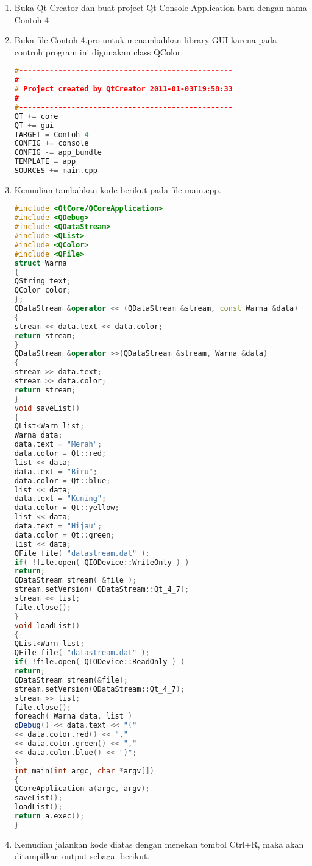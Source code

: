 \begin{enumerate}
\def\labelenumi{\arabic{enumi}.}
\item
  Buka Qt Creator dan buat project Qt Console Application baru dengan
  nama Contoh 4
\item
  Buka file Contoh 4.pro untuk menambahkan library GUI karena pada
  controh program ini digunakan class QColor.

\begin{lstlisting}[language=c++]
#-------------------------------------------------
#
# Project created by QtCreator 2011-01-03T19:58:33
#
#-------------------------------------------------
QT += core
QT += gui
TARGET = Contoh 4
CONFIG += console
CONFIG -= app_bundle
TEMPLATE = app
SOURCES += main.cpp
\end{lstlisting}
\item
  Kemudian tambahkan kode berikut pada file main.cpp.

\begin{lstlisting}[language=c++]
#include <QtCore/QCoreApplication>
#include <QDebug>
#include <QDataStream>
#include <QList>
#include <QColor>
#include <QFile>
struct Warna
{
QString text;
QColor color;
};
QDataStream &operator << (QDataStream &stream, const Warna &data)
{
stream << data.text << data.color;
return stream;
}
QDataStream &operator >>(QDataStream &stream, Warna &data)
{
stream >> data.text;
stream >> data.color;
return stream;
}
void saveList()
{
QList<Warn list;
Warna data;
data.text = "Merah";
data.color = Qt::red;
list << data;
data.text = "Biru";
data.color = Qt::blue;
list << data;
data.text = "Kuning";
data.color = Qt::yellow;
list << data;
data.text = "Hijau";
data.color = Qt::green;
list << data;
QFile file( "datastream.dat" );
if( !file.open( QIODevice::WriteOnly ) )
return;
QDataStream stream( &file );
stream.setVersion( QDataStream::Qt_4_7);
stream << list;
file.close();
}
void loadList()
{
QList<Warn list;
QFile file( "datastream.dat" );
if( !file.open( QIODevice::ReadOnly ) )
return;
QDataStream stream(&file);
stream.setVersion(QDataStream::Qt_4_7);
stream >> list;
file.close();
foreach( Warna data, list )
qDebug() << data.text << "("
<< data.color.red() << ","
<< data.color.green() << ","
<< data.color.blue() << ")";
}
int main(int argc, char *argv[])
{
QCoreApplication a(argc, argv);
saveList();
loadList();
return a.exec();
}
\end{lstlisting}
\item
  Kemudian jalankan kode diatas dengan menekan tombol Ctrl+R, maka akan
  ditampilkan output sebagai berikut.
\end{enumerate}

